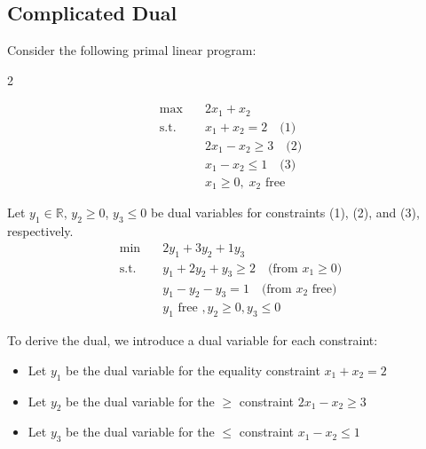 \subsection*{Complicated Dual}
\label{example:complicated-dual}
Consider the following primal linear program:
\begin{multicols}{2}
\begin{tcolorbox}[title=Primal (P), colback=blue!5, colframe=blue!60!black, sharp corners=south]
\[
\begin{aligned}
\max\quad & 2x_1 + x_2 \\
\text{s.t.} \quad
& x_1 + x_2 = 2 \quad \text{(1)} \\
& 2x_1 - x_2 \geq 3 \quad \text{(2)} \\
& x_1 - x_2 \leq 1 \quad \text{(3)} \\
& x_1 \geq 0, \; x_2 \text{ free}
\end{aligned}
\]
\end{tcolorbox}

\columnbreak

\begin{tcolorbox}[title=Dual (D), colback=green!5, colframe=green!60!black, sharp corners=south]
Let \( y_1 \in \mathbb{R} \), \( y_2 \geq 0 \), \( y_3 \leq 0 \) be dual variables for constraints (1), (2), and (3), respectively.  
\[
\begin{aligned}
\min\quad & 2y_1 + 3y_2 + 1y_3 \\
\text{s.t.} \quad
& y_1 + 2y_2 + y_3 \geq 2 \quad \text{(from } x_1 \geq 0\text{)} \\
& y_1 - y_2 - y_3 = 1 \quad \text{(from } x_2 \text{ free)}\\
& y_1  \text{ free } , y_2 \geq 0 , y_3 \leq 0 
\end{aligned}
\]
\end{tcolorbox}
\end{multicols}

To derive the dual, we introduce a dual variable for each constraint:
\begin{itemize}
    \item Let \( y_1 \) be the dual variable for the equality constraint \( x_1 + x_2 = 2 \)
    \item Let \( y_2 \) be the dual variable for the \( \geq \) constraint \( 2x_1 - x_2 \geq 3 \)
    \item Let \( y_3 \) be the dual variable for the \( \leq \) constraint \( x_1 - x_2 \leq 1 \)
\end{itemize}

